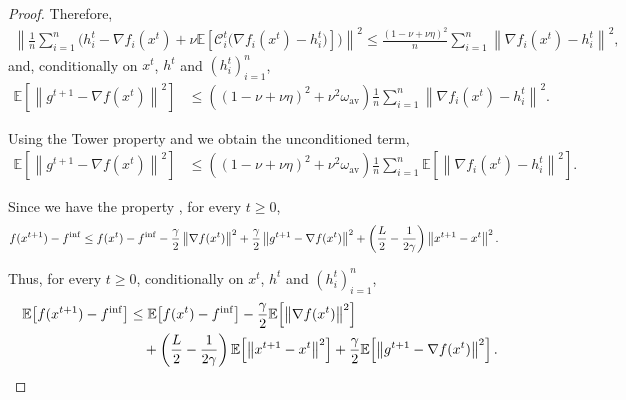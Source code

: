 \documentclass{article} %
\theoremstyle{plain}
\theoremstyle{definition}
\theoremstyle{remark}
\newcommand{\sqnorm}[1]{\left\| #1 \right\|^2}
\newcommand{\Exp}[1]{\mathbb{E}\!\left[ #1 \right]}
\newcommand{\oma}{\omega_{\mathrm{av}}}
\begin{document}
\begin{proof}
   Therefore, 
   \begin{align*}
   \sqnorm{\frac{1}{n}\sum_{i=1}^n \Big(h_i^{t}-\nabla f_i(x^t) +\nu \Exp{\mathcal{C}_i^t\big(\nabla f_i(x^t)-h_i^t\big)} \Big)} \leq \frac{(1-\nu+\nu\eta)^2}{n}\sum_{i=1}^n \sqnorm{\nabla f_i(x^t)-h_i^{t}},
   \end{align*}
   and, 
   conditionally on $x^t$, $h^t$ and $(h_i^t)_{i=1}^n$,
   \begin{align*}
   \Exp{\sqnorm{g^{t+1}-\nabla f(x^t)}} &\leq 
   \left((1-\nu+\nu\eta)^2+\nu^2\oma\right)\frac{1}{n}\sum_{i=1}^n \sqnorm{\nabla f_i(x^t)-h_i^{t}}.
   \end{align*}

   Using the Tower property and we obtain the unconditioned term,
   \begin{align*}
      \Exp{\sqnorm{g^{t+1}-\nabla f(x^t)}} &\leq 
      \left((1-\nu+\nu\eta)^2+\nu^2\oma\right)\frac{1}{n}\sum_{i=1}^n \Exp{\sqnorm{\nabla f_i(x^t)-h_i^{t}}}.
      \end{align*}
    
   Since we have the property \citep[Lemma 4]{ric21}, for every $t\geq 0$,
   \begin{align}
   f(x^{t+1}) -f^{\inf} &\leq f(x^t)  -f^{\inf} -\frac{\gamma}{2} \sqnorm{\nabla f(x^t)} +\frac{ \gamma }{2}\sqnorm{g^{t+1}-\nabla f(x^t)} + \left(\frac{ L}{2}-\frac{1}{2\gamma}\right)\sqnorm{x^{t+1}-x^t}.\notag
   \end{align}

   Thus, for every $t\geq 0$, conditionally on $x^t$, $h^t$ and $(h_i^t)_{i=1}^n$,
    \begin{align*}
   \Exp{f(x^{t+1}) -f^{\inf}} &\leq \Exp{f(x^t)  -f^{\inf}} -\frac{\gamma}{2} \Exp{\sqnorm{\nabla f(x^t)}}\notag\\
   &\quad+ \left(\frac{ L}{2}-\frac{1}{2\gamma}\right)\Exp{\sqnorm{x^{t+1}-x^t}}  + \frac{ \gamma }{2}\Exp{\sqnorm{g^{t+1}-\nabla f(x^t)}} .\notag
   \end{align*}
   

\end{proof}
\end{document}
